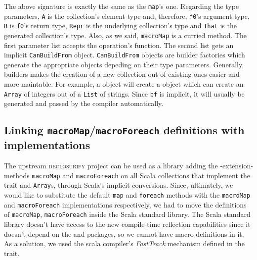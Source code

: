 The above signature is exactly the same as the \texttt{map}'s one. Regarding the
type parameters, \texttt{A} is the collection's element type and, therefore, \texttt{f0}'s
argument type, \texttt{B} is \texttt{f0}'s return type, \texttt{Repr} is the underlying collection's type
and \texttt{That} is the generated collection's type. Also, as we said, \texttt{macroMap} is a
curried method. The first parameter list accepts the operation's function. The
second list gets an implicit \texttt{CanBuildFrom} object. \texttt{CanBuildFrom} objects are
builder factories which generate the appropriate
 objects depeding on their type parameters.
Generally, builders makes the creation of a new collection out of existing ones
easier and more maintable. For example, a  object will create a  object which can
create an \texttt{Array} of integers out of a \texttt{List} of strings. Since \texttt{bf} is implicit, it
will usually be generated and passed by the compiler automatically.


\subsection{Linking \texttt{macroMap}/\texttt{macroForeach} definitions with implementations}
\label{ft_decl_std_lib}

The upstream \textsc{declosurify} project can be used as a library adding the -extension-
methods \texttt{macroMap} and \texttt{macroForeach} on all Scala collections that implement the
 trait and \texttt{Array}s, through Scala's implicit
conversions. Since, ultimately, we would like to
substitute the default \texttt{map} and \texttt{foreach} methods with the \texttt{macroMap} and
\texttt{macroForeach} implementations respectively, we had to move the definitions
of \texttt{macroMap}, \texttt{macroForeach} inside the Scala standard library. The Scala standard
library doesn't have access to the new compile-time reflection capabilities
since it doesn't depend on the  and  packages, so we
cannot have macro definitions in it. As a solution, we used the scala compiler's
\emph{FastTrack} mechanism defined in the  trait.

